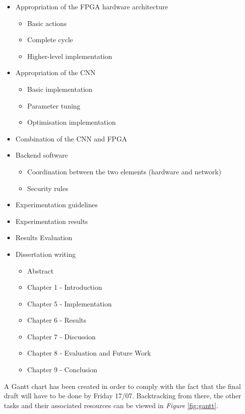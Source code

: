 \begin{itemize}
  \item Appropriation of the FPGA hardware architecture
  \begin{itemize}
    \item Basic actions
    \item Complete cycle
    \item Higher-level implementation
  \end{itemize}
  \item Appropriation of the CNN
  \begin{itemize}
    \item Basic implementation
    \item Parameter tuning
    \item Optimisation implementation
  \end{itemize}
  \item Combination of the CNN and FPGA
  \item Backend software
  \begin{itemize}
    \item Coordination between the two elements (hardware and network)
    \item Security rules
  \end{itemize}
  \item Experimentation guidelines
  \item Experimentation results
  \item Results Evaluation
  \item Dissertation writing
  \begin{itemize}
    \item Abstract
    \item Chapter 1 - Introduction
    \item Chapter 5 - Implementation
    \item Chapter 6 - Results
    \item Chapter 7 - Discussion
    \item Chapter 8 - Evaluation and Future Work
    \item Chapter 9 - Conclusion
  \end{itemize}
\end{itemize}

A Gantt chart has been created in order to comply with the fact that the final draft will have to be done by Friday 17/07. Backtracking from there, the other tasks and their associated resources can be viewed in \emph{Figure} \ref{fig:gantt}.

